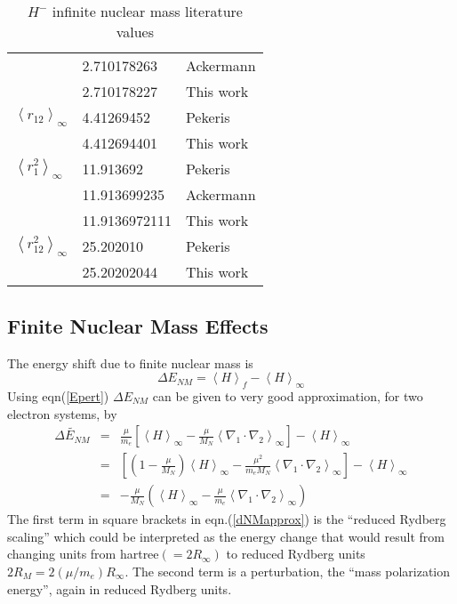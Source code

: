 \documentclass[12pt,thmsa]{article}
\begin{document}
\begin{table}[tbp]
\begin{tabular}{lll}
& 2.710178263 & {\footnotesize Ackermann}\cite{Ackermann95} \\ 
& 2.710178227 & {\footnotesize This work} \\ \hline
$\left\langle r_{12}\right\rangle _\infty $ & 4.41269452 & {\footnotesize %
Pekeris}\cite{Pekeris62} \\ 
& 4.412694401 & {\footnotesize This work} \\ \hline
$\left\langle r_1^2\right\rangle _\infty $ & 11.913692 & {\footnotesize %
Pekeris}\cite{Pekeris62} \\ 
& 11.913699235 & {\footnotesize Ackermann}\cite{Ackermann95} \\ 
& 11.9136972111 & {\footnotesize This work} \\ \hline
$\left\langle r_{12}^2\right\rangle _\infty $ & 25.202010 & {\footnotesize %
Pekeris}\cite{Pekeris62} \\ 
& 25.20202044 & {\footnotesize This work} \\ \hline\hline
\end{tabular}
\caption{$H^{-}$  infinite nuclear mass literature values \label{Litdata}}%
\end{table}%

\subsection{Finite Nuclear Mass Effects\label{nucmotian}\label{NMeffect}}

The energy shift due to finite nuclear mass is 
\begin{equation}
\Delta E_{NM}=\left\langle H\right\rangle _f-\left\langle H\right\rangle
_\infty   \label{dENM}
\end{equation}
Using eqn(\ref{Epert}) $\Delta E_{NM}$ can be given to very good
approximation, for two electron systems, by 
\begin{eqnarray}
\widetilde{\Delta E_{NM}} &=&\frac \mu {m_e}\left[ \left\langle
H\right\rangle _\infty -\frac \mu {M_N}\left\langle \nabla _1\cdot \nabla
_2\right\rangle _\infty \right] -\left\langle H\right\rangle _\infty  
\nonumber \\
&=&\left[ \left( 1-\frac \mu {M_N}\right) \left\langle H\right\rangle
_\infty -\frac{\mu ^2}{m_eM_N}\left\langle \nabla _1\cdot \nabla
_2\right\rangle _\infty \right] -\left\langle H\right\rangle _\infty  
\nonumber \\
&=&-\frac \mu {M_N}\left( \left\langle H\right\rangle _\infty -\frac \mu
{m_e}\left\langle \nabla _1\cdot \nabla _2\right\rangle _\infty \right) 
\label{dNMapprox}
\end{eqnarray}
The first term in square brackets in eqn.(\ref{dNMapprox}) is the ``reduced
Rydberg scaling'' which could be interpreted as the energy change that would
result from changing units from hartree$(=2R_\infty )$ to reduced Rydberg
units $2R_M=2(\mu /m_e)R_\infty $. The second term is a perturbation, the
``mass polarization energy'', again in reduced Rydberg units.
\end{document}
